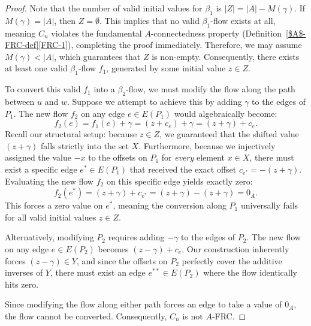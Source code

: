 \documentclass[10pt,a4paper]{amsart}
\begin{document}
\begin{proof}
Note that the number of valid initial values for $\beta_1$ is $|Z| = |A| - M(\gamma)$. If $M(\gamma) = |A|$, then $Z = \emptyset$. This implies that no valid $\beta_1$-flow exists at all, meaning $C_n$ violates the fundamental $A$-connectedness property (Definition~\ref{$A$-FRC-def}\ref{FRC-1}), completing the proof immediately. Therefore, we may assume $M(\gamma) < |A|$, which guarantees that $Z$ is non-empty. Consequently, there exists at least one valid $\beta_1$-flow $f_1$, generated by some initial value $z \in Z$.

To convert this valid $f_1$ into a $\beta_2$-flow, we must modify the flow along the path between $u$ and $w$. Suppose we attempt to achieve this by adding $\gamma$ to the edges of $P_1$. The new flow $f_2$ on any edge $e \in E(P_1)$ would algebraically become:
\[ f_2(e) = f_1(e) + \gamma = (z + c_e) + \gamma = (z + \gamma) + c_e. \]
Recall our structural setup: because $z \in Z$, we guaranteed that the shifted value $(z + \gamma)$ falls strictly into the set $X$. Furthermore, because we injectively assigned the value $-x$ to the offsets on $P_1$ for \textit{every} element $x \in X$, there must exist a specific edge $e^* \in E(P_1)$ that received the exact offset $c_{e^*} = -(z+\gamma)$. Evaluating the new flow $f_2$ on this specific edge yields exactly zero:
\[ f_2(e^*) = (z + \gamma) + c_{e^*} = (z + \gamma) - (z + \gamma) = 0_A. \]
This forces a zero value on $e^*$, meaning the conversion along $P_1$ universally fails for all valid initial values $z \in Z$.

Alternatively, modifying $P_2$ requires adding $-\gamma$ to the edges of $P_2$. The new flow on any edge $e \in E(P_2)$ becomes $(z - \gamma) + c_e$. Our construction inherently forces $(z - \gamma) \in Y$, and since the offsets on $P_2$ perfectly cover the additive inverses of $Y$, there must exist an edge $e^{**} \in E(P_2)$ where the flow identically hits zero. 

Since modifying the flow along either path forces an edge to take a value of $0_A$, the flow cannot be converted. Consequently, $C_n$ is not $A$-FRC.
\end{proof}
\end{document}
